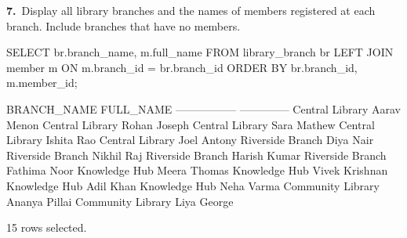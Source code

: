 \noindent\begin{minipage}{\linewidth}
\begingroup{}
{\fontsize{14}{17}\selectfont\textbf{7.}}\ Display all library branches and the names of members registered at each branch. Include branches that have no members.\par
\endgroup\vspace{12pt}


\begin{sqlcode}
SELECT br.branch_name, m.full_name
FROM library_branch br
LEFT JOIN member m ON m.branch_id = br.branch_id
ORDER BY br.branch_id, m.member_id;
\end{sqlcode}

\vspace{18pt}


\begin{sqlout}[fontsize=\small]
BRANCH_NAME        FULL_NAME     
-----------------  --------------
Central Library    Aarav Menon
Central Library    Rohan Joseph
Central Library    Sara Mathew
Central Library    Ishita Rao
Central Library    Joel Antony
Riverside Branch   Diya Nair
Riverside Branch   Nikhil Raj
Riverside Branch   Harish Kumar
Riverside Branch   Fathima Noor
Knowledge Hub      Meera Thomas
Knowledge Hub      Vivek Krishnan
Knowledge Hub      Adil Khan
Knowledge Hub      Neha Varma
Community Library  Ananya Pillai
Community Library  Liya George

15 rows selected.
\end{sqlout}
\end{minipage}\par\vspace{24pt}

